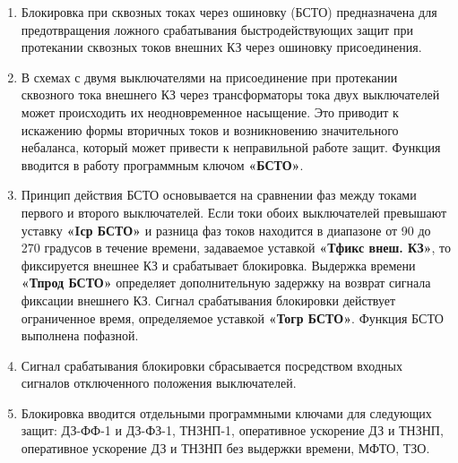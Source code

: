 
\color{black}

\begin{enumerate}[label=\arabic{section}.\arabic{subsection}.\arabic{enumi}, labelsep=4pt, leftmargin=0pt, itemindent=57pt, itemsep=0pt, parsep=0pt] %

\item
Блокировка при сквозных токах через ошиновку (БСТО) предназначена для предотвращения ложного срабатывания быстродействующих защит при протекании сквозных токов внешних КЗ через ошиновку присоединения.

\item
В схемах с двумя выключателями на присоединение при протекании сквозного тока внешнего КЗ через трансформаторы тока двух выключателей может происходить их неодновременное насыщение. Это приводит к искажению формы вторичных токов и возникновению значительного небаланса, который может привести к неправильной работе защит. Функция вводится в работу программным ключом \textbf{«БСТО»}.

\item
Принцип действия БСТО основывается на сравнении фаз между токами первого и второго выключателей. Если токи обоих выключателей превышают уставку \textbf{«Iср БСТО»} и разница фаз токов находится в диапазоне от 90 до 270 градусов в течение времени, задаваемое уставкой \textbf{«Тфикс внеш. КЗ»}, то фиксируется внешнее КЗ и срабатывает блокировка. Выдержка времени \textbf{«Тпрод БСТО»} определяет дополнительную задержку на возврат сигнала фиксации внешнего КЗ. Сигнал срабатывания блокировки действует ограниченное время, определяемое уставкой \textbf{«Тогр БСТО»}. Функция БСТО выполнена пофазной.

\item
Сигнал срабатывания блокировки сбрасывается посредством входных сигналов отключенного положения выключателей.

\item
Блокировка вводится отдельными программными ключами для следующих защит: ДЗ-ФФ-1 и ДЗ-ФЗ-1, ТНЗНП-1, оперативное ускорение ДЗ и ТНЗНП, оперативное ускорение ДЗ и ТНЗНП без выдержки времени, МФТО, ТЗО.


\end{enumerate}
